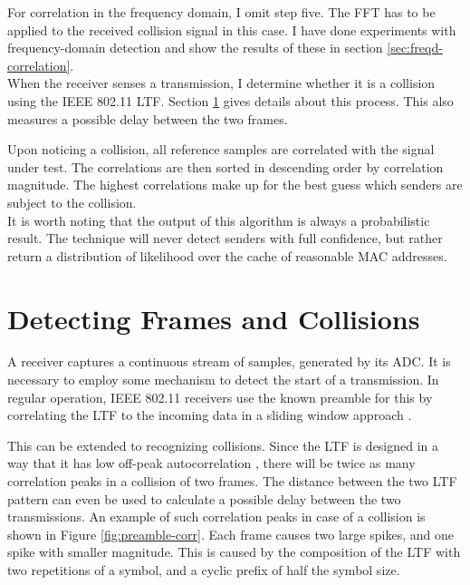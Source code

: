 For correlation in the frequency domain, I omit step five. The \gls{FFT} has to be applied to the received collision signal in this case. I have done experiments with frequency-domain detection and show the results of these in section \ref{sec:freqd-correlation}.\\

When the receiver senses a transmission, I determine whether it is a collision using the IEEE 802.11 \gls{LTF}. Section \ref{sec:preamble-corr} gives details about this process. This also measures a possible delay between the two frames.

Upon noticing a collision, all reference samples are correlated with the signal under test. The correlations are then sorted in descending order by correlation magnitude. The highest correlations make up for the best guess which senders are subject to the collision.\\

It is worth noting that the output of this algorithm is always a probabilistic result. The technique will never detect senders with full confidence, but rather return a distribution of likelihood over the cache of reasonable \gls{MAC} addresses.



\section{Detecting Frames and Collisions}\label{sec:preamble-corr}

A receiver captures a continuous stream of samples, generated by its \gls{ADC}. It is necessary to employ some mechanism to detect the start of a transmission. In regular operation, IEEE 802.11 receivers use the known preamble for this by correlating the \gls{LTF} to the incoming data in a sliding window approach \cite{perahia2013}.

This can be extended to recognizing collisions. Since the \gls{LTF} is designed in a way that it has low off-peak autocorrelation \cite{ieee2012}, there will be twice as many correlation peaks in a collision of two frames. The distance between the two \gls{LTF} pattern can even be used to calculate a possible delay between the two transmissions. An example of such correlation peaks in case of a collision is shown in Figure \ref{fig:preamble-corr}. Each frame causes two large spikes, and one spike with smaller magnitude. This is caused by the composition of the \gls{LTF} with two repetitions of a symbol, and a cyclic prefix of half the symbol size.\\

